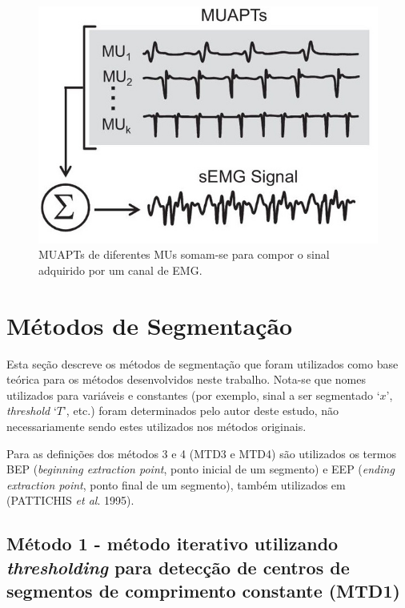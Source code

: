 \begin{figure}[htb]
	\caption{\label{fig_MUAP_trains}MUAPTs de diferentes MUs somam-se para compor o sinal adquirido por um canal de EMG.}
	\begin{center}
	    \includegraphics[width=0.75\linewidth]{./img/MUAP_trains.jpg}
	\end{center}
\end{figure}

\section{Métodos de Segmentação}

Esta seção descreve os métodos de segmentação que foram utilizados como base teórica para os métodos desenvolvidos neste trabalho. Nota-se que nomes utilizados para variáveis e constantes (por exemplo, sinal a ser segmentado `$x$', \emph{threshold} `$T$', etc.) foram determinados pelo autor deste estudo, não necessariamente sendo estes utilizados nos métodos originais.

Para as definições dos métodos 3 e 4 (MTD3 e MTD4) são utilizados os termos BEP (\emph{beginning extraction point}, ponto inicial de um segmento) e EEP (\emph{ending extraction point}, ponto final de um segmento), também utilizados em (PATTICHIS \emph{et al}. 1995).
	
\subsection{Método 1 - método iterativo utilizando \emph{thresholding} para detecção de centros de segmentos de comprimento constante (MTD1)}

